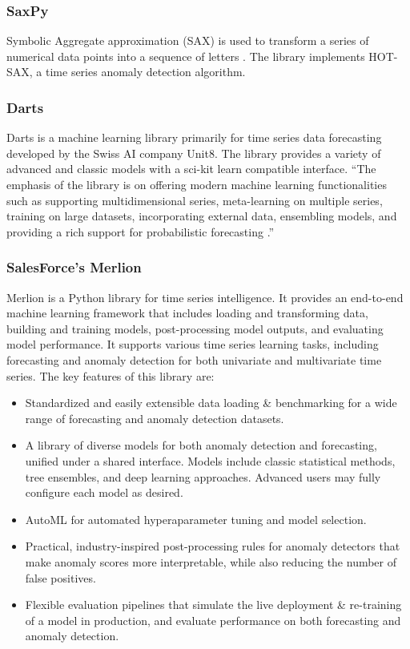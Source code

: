 \subsubsection{SaxPy}

Symbolic Aggregate approximation (SAX) is used to transform a series of numerical data points into a sequence of letters \cite{senin2018grammarviz-saxpy}. The library implements HOT-SAX, a time series anomaly detection algorithm. 


\subsubsection{Darts}
Darts is a machine learning library primarily for time series data forecasting developed by the Swiss AI company Unit8. The library provides a variety of advanced and classic models with a sci-kit learn compatible interface. \enquote{The emphasis of the library is on offering modern machine learning functionalities such as supporting multidimensional series, meta-learning on multiple series, training on large datasets, incorporating external data, ensembling models, and providing a rich support for probabilistic forecasting \cite{herzen2021darts}.}

\subsubsection{SalesForce's Merlion}
Merlion \cite{bhatnagar2021merlion} is a Python library for time series intelligence. It provides an end-to-end machine learning framework that includes loading and transforming data, building and training models, post-processing model outputs, and evaluating model performance. It supports various time series learning tasks, including forecasting and anomaly detection for both univariate and multivariate time series.
The key features of this library are:
\begin{itemize}[leftmargin=1cm]
    \item Standardized and easily extensible data loading \& benchmarking for a wide range of forecasting and anomaly detection datasets.
    \item A library of diverse models for both anomaly detection and forecasting, unified under a shared interface. Models include classic statistical methods, tree ensembles, and deep learning approaches. Advanced users may fully configure each model as desired.
    \item AutoML for automated hyperaparameter tuning and model selection.
    \item Practical, industry-inspired post-processing rules for anomaly detectors that make anomaly scores more interpretable, while also reducing the number of false positives.
    \item Flexible evaluation pipelines that simulate the live deployment \& re-training of a model in production, and evaluate performance on both forecasting and anomaly detection.
\end{itemize}

